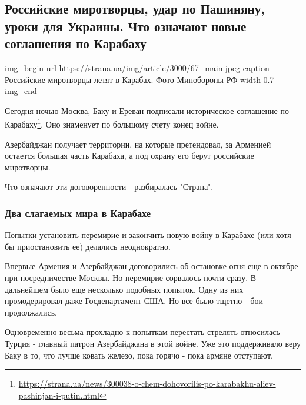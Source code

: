  
 
 

\subsection{Российские миротворцы, удар по Пашиняну, уроки для Украины. Что означают новые соглашения по Карабаху}
\label{sec:10_11_2020.news.ua.strana.4.karabah_dogovor}


\ifcmt
img_begin 
	url https://strana.ua/img/article/3000/67_main.jpeg
	caption Российские миротворцы летят в Карабах. Фото Минобороны РФ 
	width 0.7
img_end
\fi

Сегодня ночью Москва, Баку и Ереван подписали историческое соглашение по
Карабаху\footnote{\url{https://strana.ua/news/300038-o-chem-dohovorilis-po-karabakhu-aliev-pashinjan-i-putin.html}}.
Оно знаменует по большому счету конец войне.

Азербайджан получает территории, на которые претендовал, за Арменией остается
большая часть Карабаха, а под охрану его берут российские миротворцы. 

Что означают эти договоренности - разбиралась "Страна". 

\subsubsection{Два слагаемых мира в Карабахе}

Попытки установить перемирие и закончить новую войну в Карабахе (или хотя бы
приостановить ее) делались неоднократно.

Впервые Армения и Азербайджан договорились об остановке огня еще в октябре при
посредничестве Москвы. Но перемирие сорвалось почти сразу. В дальнейшем было
еще несколько подобных попыток. Одну из них промодерировал даже Госдепартамент
США. Но все было тщетно - бои продолжались.

Одновременно весьма прохладно к попыткам перестать стрелять относилась Турция -
главный патрон Азербайджана в этой войне. Уже это поддерживало веру Баку в то,
что лучше ковать железо, пока горячо - пока армяне отступают. 

